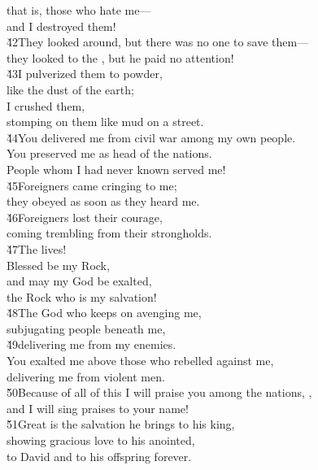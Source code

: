 \begin{poetry}
\poemll    that is, those who hate me--- \\
\poemlll       and I destroyed them! \\
\poeml \v{42}They looked around, but there was no one to save them--- \\
\poemll    they looked to the , but he paid no attention! \\
\poeml \v{43}I pulverized them to powder, \\
\poemll    like the dust of the earth; \\
\poeml I crushed them, \\
\poemll    stomping on them like mud on a street. \\
\poeml \v{44}You delivered me from civil war among my own people. \\
\poemll    You preserved me as head of the nations. \\
\poemlll       People whom I had never known served me! \\
\poeml \v{45}Foreigners came cringing to me; \\
\poemll    they obeyed as soon as they heard me. \\
\poeml \v{46}Foreigners lost their courage, \\
\poemll    coming trembling from their strongholds. \\
\poeml \v{47}The  lives! \\
\poemll    Blessed be my Rock, \\
\poeml and may my God be exalted, \\
\poemll    the Rock who is my salvation! \\
\poeml \v{48}The God who keeps on avenging me, \\
\poemll    subjugating people beneath me, \\
\poeml \v{49}delivering me from my enemies. \\
\poeml You exalted me above those who rebelled against me, \\
\poemll    delivering me from violent men. \\
\poeml \v{50}Because of all of this I will praise you among the nations, , \\
\poemll    and I will sing praises to your name! \\
\poeml \v{51}Great is the salvation he brings to his king, \\
\poemll    showing gracious love to his anointed, \\
\poemlll       to David and to his offspring forever.
\end{poetry}

